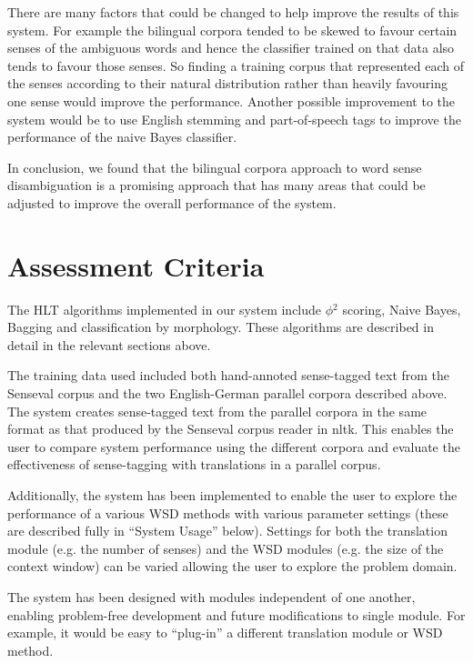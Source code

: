 \documentclass[a4wide,10pt]{article}
\begin{document}
There are many factors that could be changed to help improve the
results of this system.  For example the bilingual corpora tended to be
skewed
to favour certain senses of the ambiguous words and hence the 
classifier
trained on that data also tends to favour those senses.
So finding a training corpus that represented each of the senses 
according
to
their natural distribution rather than heavily favouring one sense 
would improve the performance.
Another possible improvement to the system would be to use English
stemming and
part-of-speech tags to improve the performance of the naive Bayes classifier.

In conclusion, we found that the bilingual corpora approach to word 
sense
disambiguation is a promising approach that has many areas that could 
be adjusted to improve the overall performance of the system.


\section{Assessment Criteria} 

The HLT algorithms implemented in our system include $\phi$$^2$ scoring,
Naive Bayes, Bagging and classification by morphology. These algorithms are 
described in detail in the relevant sections above. 

The training data used included both hand-annoted sense-tagged text from the
Senseval corpus and the two English-German parallel corpora described above. 
The system creates sense-tagged text from the parallel corpora in the same 
format as that produced by the Senseval corpus reader in nltk. This enables
the user to compare system performance using the different corpora and 
evaluate the effectiveness of sense-tagging with translations in a 
parallel corpus.   

Additionally, the system has been implemented to enable the user to explore 
the performance of a various WSD methods with various parameter settings
(these are described fully in ``System Usage'' below).  Settings for both the
translation module (e.g. the number of senses) and the WSD modules (e.g. 
the size of the context window) can be varied allowing the user to explore the 
problem domain.  

The system has been designed with modules independent of one another, 
enabling problem-free development and future modifications to single
module. For example, it would be easy to ``plug-in'' a different translation 
module or WSD method. 
\end{document}
